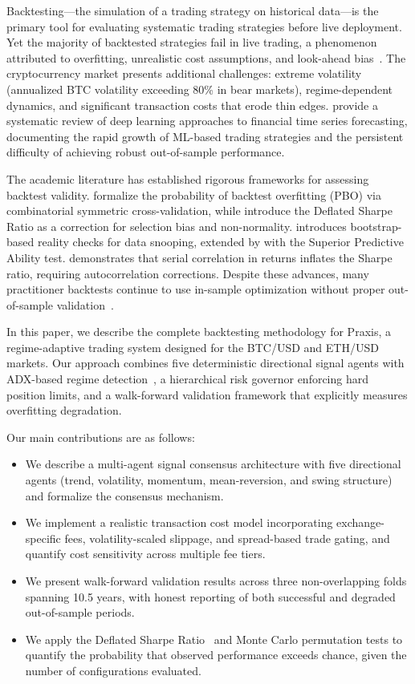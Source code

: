 \documentclass{article}
\begin{document}
Backtesting---the simulation of a trading strategy on historical data---is the primary tool for evaluating systematic trading strategies before live deployment.
Yet the majority of backtested strategies fail in live trading, a phenomenon attributed to overfitting, unrealistic cost assumptions, and look-ahead bias~\citep{Bailey2014PseudoMath, Harvey2015Backtesting}.
The cryptocurrency market presents additional challenges: extreme volatility (annualized BTC volatility exceeding 80\% in bear markets), regime-dependent dynamics, and significant transaction costs that erode thin edges.
\citet{Sezer2020} provide a systematic review of deep learning approaches to financial time series forecasting, documenting the rapid growth of ML-based trading strategies and the persistent difficulty of achieving robust out-of-sample performance.

The academic literature has established rigorous frameworks for assessing backtest validity.
\citet{Bailey2017PBO} formalize the probability of backtest overfitting (PBO) via combinatorial symmetric cross-validation, while \citet{Bailey2014DSR} introduce the Deflated Sharpe Ratio as a correction for selection bias and non-normality.
\citet{White2000} introduces bootstrap-based reality checks for data snooping, extended by \citet{Hansen2005SPA} with the Superior Predictive Ability test.
\citet{lo2002statistics} demonstrates that serial correlation in returns inflates the Sharpe ratio, requiring autocorrelation corrections.
Despite these advances, many practitioner backtests continue to use in-sample optimization without proper out-of-sample validation~\citep{LopezDePrado2018}.

In this paper, we describe the complete backtesting methodology for Praxis, a regime-adaptive trading system designed for the BTC/USD and ETH/USD markets.
Our approach combines five deterministic directional signal agents with ADX-based regime detection~\citep{Wilder1978}, a hierarchical risk governor enforcing hard position limits, and a walk-forward validation framework that explicitly measures overfitting degradation.

Our main contributions are as follows:
\begin{itemize}[nosep]
  \item We describe a multi-agent signal consensus architecture with five directional agents (trend, volatility, momentum, mean-reversion, and swing structure) and formalize the consensus mechanism.
  \item We implement a realistic transaction cost model incorporating exchange-specific fees, volatility-scaled slippage, and spread-based trade gating, and quantify cost sensitivity across multiple fee tiers.
  \item We present walk-forward validation results across three non-overlapping folds spanning 10.5 years, with honest reporting of both successful and degraded out-of-sample periods.
  \item We apply the Deflated Sharpe Ratio~\citep{Bailey2014DSR} and Monte Carlo permutation tests to quantify the probability that observed performance exceeds chance, given the number of configurations evaluated.
\end{itemize}
\end{document}
